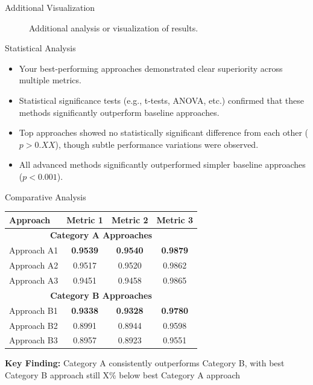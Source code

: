 \documentclass[
    10pt,
    aspectratio=169,
]{beamer}
\begin{document}
\begin{frame}{Additional Visualization}
\begin{figure}
    \centering
    \caption{Additional analysis or visualization of results.}
    \label{fig:visualization}
\end{figure}
\end{frame}

\begin{frame}{Statistical Analysis}
\begin{itemize}
    \item Your best-performing approaches demonstrated clear superiority across multiple metrics.
    \item Statistical significance tests (e.g., t-tests, ANOVA, etc.) confirmed that these methods significantly outperform baseline approaches.
    \item Top approaches showed no statistically significant difference from each other ($p>0.XX$), though subtle performance variations were observed.
    \item All advanced methods significantly outperformed simpler baseline approaches ($p < 0.001$).
\end{itemize}
\end{frame}

\begin{frame}{Comparative Analysis}
\begin{table}[]
\centering
\small
\begin{tabular}{|l|c|c|c|}
\hline
\textbf{Approach} & \textbf{Metric 1} & \textbf{Metric 2} & \textbf{Metric 3} \\ \hline
\multicolumn{4}{|c|}{\cellcolor[HTML]{90EE90}\textbf{Category A Approaches}} \\ \hline
Approach A1 & \textbf{0.9539} & \textbf{0.9540} & \textbf{0.9879} \\ \hline
Approach A2 & 0.9517 & 0.9520 & 0.9862 \\ \hline
Approach A3 & 0.9451 & 0.9458 & 0.9865 \\ \hline
\multicolumn{4}{|c|}{\cellcolor[HTML]{FFD700}\textbf{Category B Approaches}} \\ \hline
Approach B1 & \textbf{0.9338} & \textbf{0.9328} & \textbf{0.9780} \\ \hline
Approach B2 & 0.8991 & 0.8944 & 0.9598 \\ \hline
Approach B3 & 0.8957 & 0.8923 & 0.9551 \\ \hline
\end{tabular}
\end{table}
\vspace{0.2cm}
\small
\textbf{Key Finding:} Category A consistently outperforms Category B, with best Category B approach still X\% below best Category A approach
\end{frame}
\end{document}
